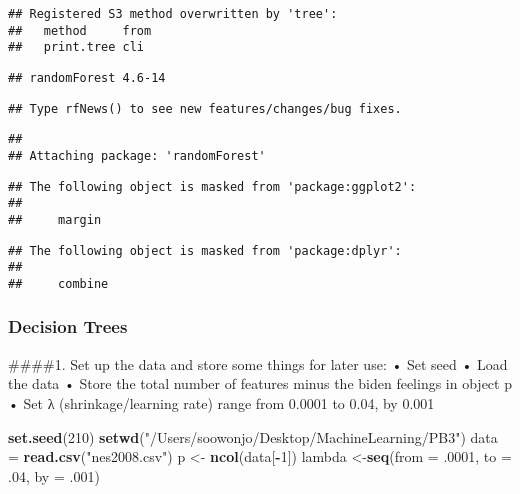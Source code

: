 \documentclass[]{article}
\newenvironment{Shaded}{\begin{snugshade}}{\end{snugshade}}
\newcommand{\DataTypeTok}[1]{\textcolor[rgb]{0.13,0.29,0.53}{#1}}
\newcommand{\DecValTok}[1]{\textcolor[rgb]{0.00,0.00,0.81}{#1}}
\newcommand{\FloatTok}[1]{\textcolor[rgb]{0.00,0.00,0.81}{#1}}
\newcommand{\KeywordTok}[1]{\textcolor[rgb]{0.13,0.29,0.53}{\textbf{#1}}}
\newcommand{\NormalTok}[1]{#1}
\newcommand{\OperatorTok}[1]{\textcolor[rgb]{0.81,0.36,0.00}{\textbf{#1}}}
\newcommand{\StringTok}[1]{\textcolor[rgb]{0.31,0.60,0.02}{#1}}
\begin{document}
\begin{verbatim}
## Registered S3 method overwritten by 'tree':
##   method     from
##   print.tree cli
\end{verbatim}

\begin{verbatim}
## randomForest 4.6-14
\end{verbatim}

\begin{verbatim}
## Type rfNews() to see new features/changes/bug fixes.
\end{verbatim}

\begin{verbatim}
## 
## Attaching package: 'randomForest'
\end{verbatim}

\begin{verbatim}
## The following object is masked from 'package:ggplot2':
## 
##     margin
\end{verbatim}

\begin{verbatim}
## The following object is masked from 'package:dplyr':
## 
##     combine
\end{verbatim}

\hypertarget{decision-trees}{%
\subsubsection{Decision Trees}\label{decision-trees}}

\#\#\#\#1. Set up the data and store some things for later use: • Set
seed • Load the data • Store the total number of features minus the
biden feelings in object p • Set λ (shrinkage/learning rate) range from
0.0001 to 0.04, by 0.001

\begin{Shaded}
\begin{Highlighting}[]
\KeywordTok{set.seed}\NormalTok{(}\DecValTok{210}\NormalTok{)}
\KeywordTok{setwd}\NormalTok{(}\StringTok{"/Users/soowonjo/Desktop/MachineLearning/PB3"}\NormalTok{)}
\NormalTok{data =}\StringTok{ }\KeywordTok{read.csv}\NormalTok{(}\StringTok{"nes2008.csv"}\NormalTok{)}
\NormalTok{p <-}\StringTok{ }\KeywordTok{ncol}\NormalTok{(data[}\OperatorTok{-}\DecValTok{1}\NormalTok{]) }
\NormalTok{lambda <-}\KeywordTok{seq}\NormalTok{(}\DataTypeTok{from =} \FloatTok{.0001}\NormalTok{, }\DataTypeTok{to =} \FloatTok{.04}\NormalTok{, }\DataTypeTok{by =} \FloatTok{.001}\NormalTok{)}
\end{Highlighting}
\end{Shaded}
\end{document}
